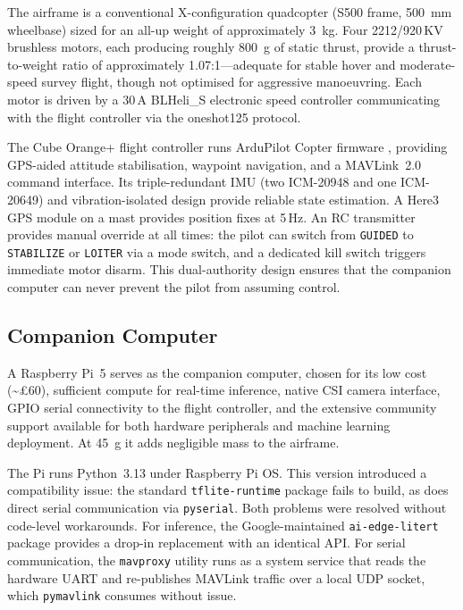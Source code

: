 The airframe is a conventional X-configuration quadcopter (S500 frame, \SI{500}{\milli\metre} wheelbase) sized for an all-up weight of approximately \SI{3}{\kilo\gram}. Four 2212/920\,KV brushless motors, each producing roughly \SI{800}{\gram} of static thrust, provide a thrust-to-weight ratio of approximately 1.07:1---adequate for stable hover and moderate-speed survey flight, though not optimised for aggressive manoeuvring. Each motor is driven by a 30\,A BLHeli\_S electronic speed controller communicating with the flight controller via the oneshot125 protocol.

The Cube Orange+ flight controller \cite{cubepilot} runs ArduPilot Copter firmware \cite{ardupilot}, providing GPS-aided attitude stabilisation, waypoint navigation, and a MAVLink~2.0 command interface. Its triple-redundant IMU (two ICM-20948 and one ICM-20649) and vibration-isolated design provide reliable state estimation. A Here3 GPS module on a mast provides position fixes at 5\,Hz. An RC transmitter provides manual override at all times: the pilot can switch from \texttt{GUIDED} to \texttt{STABILIZE} or \texttt{LOITER} via a mode switch, and a dedicated kill switch triggers immediate motor disarm. This dual-authority design ensures that the companion computer can never prevent the pilot from assuming control.


\subsection{Companion Computer}\label{sec:hw-pi}

A Raspberry Pi~5 \cite{raspberrypi5} serves as the companion computer, chosen for its low cost (\textasciitilde\pounds60), sufficient compute for real-time inference, native CSI camera interface, GPIO serial connectivity to the flight controller, and the extensive community support available for both hardware peripherals and machine learning deployment. At \SI{45}{\gram} it adds negligible mass to the airframe.

The Pi runs Python~3.13 under Raspberry Pi OS. This version introduced a compatibility issue: the standard \texttt{tflite-runtime} package fails to build, as does direct serial communication via \texttt{pyserial}. Both problems were resolved without code-level workarounds. For inference, the Google-maintained \texttt{ai-edge-litert} package provides a drop-in replacement with an identical API. For serial communication, the \texttt{mavproxy} utility \cite{mavproxy} runs as a system service that reads the hardware UART and re-publishes MAVLink traffic over a local UDP socket, which \texttt{pymavlink} consumes without issue.

